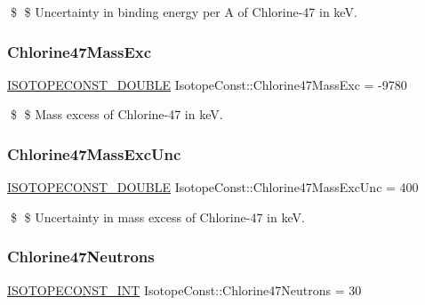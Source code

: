 \$ \$ Uncertainty in binding energy per A of Chlorine-\/47 in keV. \mbox{\label{group___isotope_const-_chlorine-_cl47_ga96b07a510888d36cb90a3a2191b9472c}} 
\subsubsection{\texorpdfstring{Chlorine47\+Mass\+Exc}{Chlorine47MassExc}}
{\footnotesize\ttfamily \mbox{\hyperlink{group___isotope_const-_macros_ga8f45a7272ce02c0b4c65c44636ed719a}{I\+S\+O\+T\+O\+P\+E\+C\+O\+N\+S\+T\+\_\+\+D\+O\+U\+B\+LE}} Isotope\+Const\+::\+Chlorine47\+Mass\+Exc = -\/9780}

\$ \$ Mass excess of Chlorine-\/47 in keV. \mbox{\label{group___isotope_const-_chlorine-_cl47_ga650b93c2f0ec50f49e552e1968da1654}} 
\subsubsection{\texorpdfstring{Chlorine47\+Mass\+Exc\+Unc}{Chlorine47MassExcUnc}}
{\footnotesize\ttfamily \mbox{\hyperlink{group___isotope_const-_macros_ga8f45a7272ce02c0b4c65c44636ed719a}{I\+S\+O\+T\+O\+P\+E\+C\+O\+N\+S\+T\+\_\+\+D\+O\+U\+B\+LE}} Isotope\+Const\+::\+Chlorine47\+Mass\+Exc\+Unc = 400}

\$ \$ Uncertainty in mass excess of Chlorine-\/47 in keV. \mbox{\label{group___isotope_const-_chlorine-_cl47_gac64dc04f28a2438dd978661682c9d1b1}} 
\subsubsection{\texorpdfstring{Chlorine47\+Neutrons}{Chlorine47Neutrons}}
{\footnotesize\ttfamily \mbox{\hyperlink{group___isotope_const-_macros_ga5f18360b3e99483a35c32d789e62621c}{I\+S\+O\+T\+O\+P\+E\+C\+O\+N\+S\+T\+\_\+\+I\+NT}} Isotope\+Const\+::\+Chlorine47\+Neutrons = 30}

